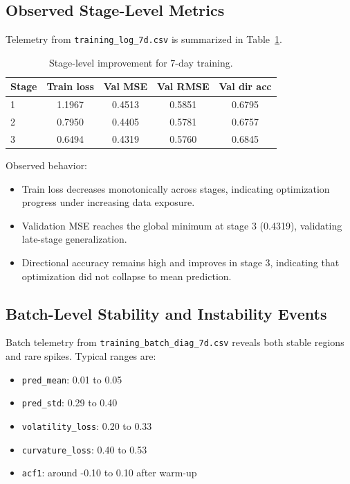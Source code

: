 \documentclass{article}
\begin{document}
\subsection{Observed Stage-Level Metrics}
Telemetry from \texttt{training\_log\_7d.csv} is summarized in Table~\ref{tab:stage-metrics}.

\begin{table}[t]
\centering
\begin{tabular}{lcccc}
\toprule
Stage & Train loss & Val MSE & Val RMSE & Val dir acc \\
\midrule
1 & 1.1967 & 0.4513 & 0.5851 & 0.6795 \\
2 & 0.7950 & 0.4405 & 0.5781 & 0.6757 \\
3 & 0.6494 & 0.4319 & 0.5760 & 0.6845 \\
\bottomrule
\end{tabular}
\caption{Stage-level improvement for 7-day training.}
\label{tab:stage-metrics}
\end{table}

Observed behavior:
\begin{itemize}
\item Train loss decreases monotonically across stages, indicating optimization progress under increasing data exposure.
\item Validation MSE reaches the global minimum at stage 3 (0.4319), validating late-stage generalization.
\item Directional accuracy remains high and improves in stage 3, indicating that optimization did not collapse to mean prediction.
\end{itemize}

\subsection{Batch-Level Stability and Instability Events}
Batch telemetry from \texttt{training\_batch\_diag\_7d.csv} reveals both stable regions and rare spikes. Typical ranges are:
\begin{itemize}
\item \texttt{pred\_mean}: 0.01 to 0.05
\item \texttt{pred\_std}: 0.29 to 0.40
\item \texttt{volatility\_loss}: 0.20 to 0.33
\item \texttt{curvature\_loss}: 0.40 to 0.53
\item \texttt{acf1}: around -0.10 to 0.10 after warm-up
\end{itemize}
\end{document}
